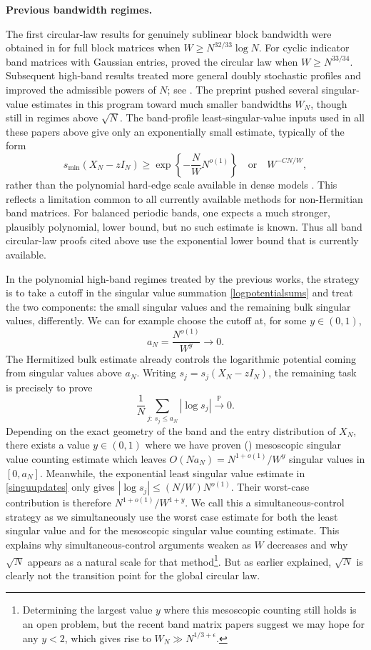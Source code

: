 \documentclass[11pt,reqno]{amsart}
\numberwithin{equation}{section}
\theoremstyle{definition}
\theoremstyle{remark}
\newcommand{\1}{\mathbf 1}
\newcommand{\introheading}[1]{%
  \par\medskip\noindent\textbf{#1.}\par\smallskip}
\begin{document}
\introheading{Previous bandwidth regimes}
The first circular-law results for genuinely sublinear block bandwidth
were obtained in \cite{JainJanaLuhORourke2021} for full block matrices when $W\geq N^{32/33}\log N$.  For cyclic indicator band matrices with Gaussian entries, \cite[Corollary~1.2]{Tikhomirov2023} proved the
circular law when \(W\ge N^{33/34}\).  Subsequent high-band results
treated more general doubly stochastic profiles and improved the
admissible powers of \(N\); see \cite{Han2410}.  The preprint
\cite{Han2508} pushed several singular-value estimates in this program
toward much smaller bandwidths \(W_N\), though still in regimes above
\(\sqrt N\).  The band-profile least-singular-value inputs used in all these papers above give only an exponentially small estimate, typically of the form
\begin{equation}\label{singuupdates}
 s_{\min}(X_N-zI_N)\ge
 \exp\!\left\{-\frac{N}{W}N^{o(1)}\right\}
 \quad\text{or}\quad W^{-CN/W},
\end{equation}
rather than the polynomial hard-edge scale available in dense models
\cite{JainJanaLuhORourke2021,Tikhomirov2023,Han2508}.  This reflects a
limitation common to all currently available methods for non-Hermitian
band matrices.  For balanced periodic bands, one expects a much
stronger, plausibly polynomial, lower bound, but no such estimate is
known.  Thus all band circular-law proofs cited above use the exponential
lower bound that is currently available.

In the polynomial high-band regimes treated by the previous works, the strategy is to take a cutoff in the singular value summation \eqref{logpotentialsums} and treat the two components: the small singular values and the remaining bulk singular values, differently. We can for example choose the cutoff at, for some $y\in(0,1)$,
\[
 a_N=\frac{N^{o(1)}}{W^y}\longrightarrow0.
\]
The Hermitized bulk estimate already controls the logarithmic potential
coming from singular values above \(a_N\).  Writing
\(s_j=s_j(X_N-zI_N)\), the remaining task is precisely to prove
\[
 \frac1N\sum_{j:\,s_j\le a_N}|\log s_j|
 \xrightarrow{\mathbb P}0.
\]
Depending on the exact geometry of the band and the entry distribution of $X_N$, there exists a value $y\in(0,1)$ where we have proven (\cite{Han2410,Han2508}) mesoscopic singular value counting estimate which leaves
\(O(Na_N)=N^{1+o(1)}/W^y\) singular values in \([0,a_N]\). Meanwhile, the
exponential least singular value estimate in \eqref{singuupdates} only gives
\(|\log s_j|\le (N/W)N^{o(1)}\).  Their worst-case contribution is
therefore \(N^{1+o(1)}/W^{1+y}\). We call this a simultaneous-control strategy as we simultaneously use the worst case estimate for both the least singular value and for the mesoscopic singular value counting estimate. This explains why simultaneous-control arguments
weaken as \(W\) decreases and why \(\sqrt N\) appears as a natural scale
for that method\footnote{Determining the largest value $y$ where this mesoscopic counting still holds is an open problem, but the recent band matrix papers \cite{YauYin2025,ErdosRiabov2025} suggest we may hope for any $y<2$, which gives rise to $W_N\gg N^{1/3+\epsilon}$.}. But as earlier explained, $\sqrt{N}$ is clearly not the transition point for the
global circular law.
\end{document}

